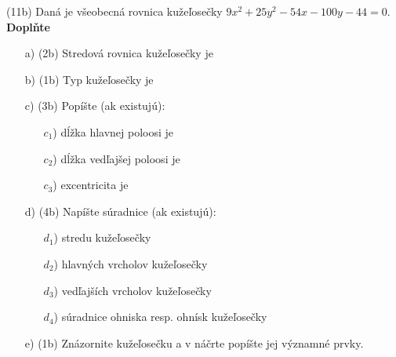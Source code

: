 \pr (11b) Daná je všeobecná rovnica kužeľosečky $9x^2+25y^2-54x-100y-44=0$.\\
\textbf{Doplňte}
\begin{enumerate}
\item[a)] (2b) Stredová rovnica kužeľosečky je\gr
\item[b)] (1b) Typ kužeľosečky je \gr
\item[c)] (3b) Popíšte (ak existujú):
\begin{enumerate}
\item[$c_1$)] dĺžka hlavnej poloosi je \gr
\item[$c_2$)] dĺžka vedľajšej poloosi je \gr
\item[$c_3$)] excentricita je \gr
\end{enumerate}
\item[d)] (4b) Napíšte súradnice (ak existujú):
\begin{itemize}
\item[$d_1$)] stredu kužeľosečky \gr
\item[$d_2$)] hlavných vrcholov kužeľosečky \gr
\item[$d_3$)] vedľajších vrcholov kužeľosečky \gr
\item[$d_4$)] súradnice ohniska resp. ohnísk kužeľosečky \gr
\end{itemize}
\item[e)] (1b) Znázornite kužeľosečku a v náčrte popíšte jej významné prvky.
\end{enumerate}

\newpage
